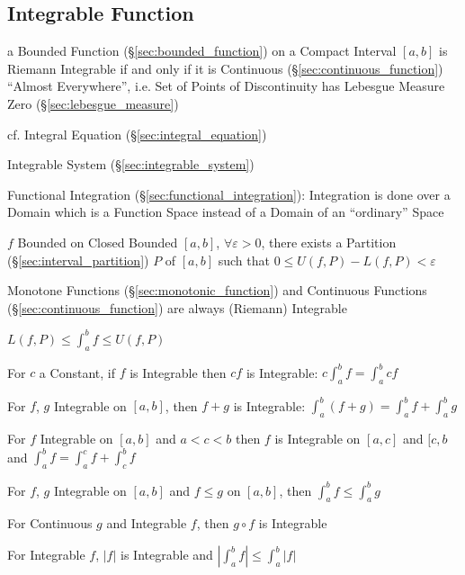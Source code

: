 \subsection{Integrable Function}\label{sec:integrable_function}


a Bounded Function (\S\ref{sec:bounded_function}) on a Compact Interval $[a,b]$
is Riemann Integrable if and only if it is Continuous
(\S\ref{sec:continuous_function}) ``Almost Everywhere'', i.e. Set of Points of
Discontinuity has Lebesgue Measure Zero (\S\ref{sec:lebesgue_measure})

cf. Integral Equation (\S\ref{sec:integral_equation})

\fist Integrable System (\S\ref{sec:integrable_system})

\fist Functional Integration (\S\ref{sec:functional_integration}): Integration
is done over a Domain which is a Function Space instead of a Domain of an
``ordinary'' Space

$f$ Bounded on Closed Bounded $[a,b]$, $\forall \varepsilon >0$, there
exists a Partition (\S\ref{sec:interval_partition}) $P$ of $[a,b]$
such that $0 \leq U(f,P) - L(f,P) < \varepsilon$ %

Monotone Functions (\S\ref{sec:monotonic_function}) and Continuous
Functions (\S\ref{sec:continuous_function}) are always (Riemann)
Integrable

$L(f,P) \leq \int_a^b f \leq U(f,P)$

For $c$ a Constant, if $f$ is Integrable then $cf$ is Integrable: $c
\int_a^b f = \int_a^b c f$

For $f$, $g$ Integrable on $[a,b]$, then $f + g$ is Integrable:
$\int_a^b (f+g) = \int_a^b f + \int_a^b g$

For $f$ Integrable on $[a,b]$ and $a < c < b$ then $f$ is Integrable
on $[a,c]$ and $[c,b$ and $\int_a^b f = \int_a^c f + \int_c^b f$

For $f$, $g$ Integrable on $[a,b]$ and $f \leq g$ on $[a,b]$, then
$\int_a^b f \leq \int_a^b g$

For Continuous $g$ and Integrable $f$, then $g \circ f$ is Integrable

For Integrable $f$, $|f|$ is Integrable and $|\int_a^b f| \leq
\int_a^b |f|$



